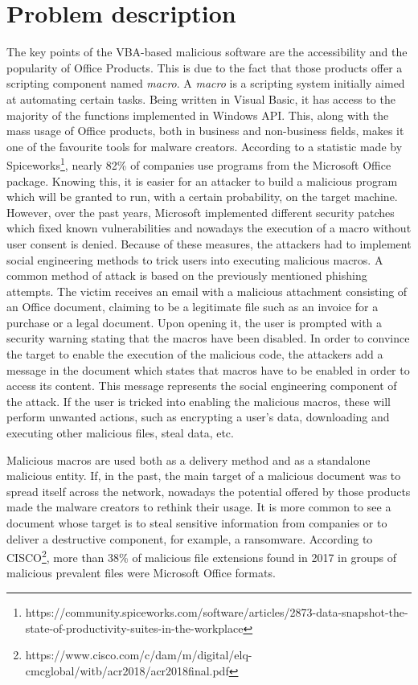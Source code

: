\section{Problem description}

The key points of the VBA-based malicious software are the accessibility and the popularity of Office Products. This is due to the fact that those products offer a scripting component named \textit{macro}. A \textit{macro} is a scripting system initially aimed at automating certain tasks. Being written in Visual Basic, it has access to the majority of the functions implemented in Windows API. This, along with the mass usage of Office products, both in business and non-business fields, makes it one of the favourite tools for malware creators. According to a statistic made by Spiceworks\footnote{https://community.spiceworks.com/software/articles/2873-data-snapshot-the-state-of-productivity-suites-in-the-workplace}, nearly 82\% of companies use programs from the Microsoft Office package. Knowing this, it is easier for an attacker to build a malicious program which will be granted to run, with a certain probability, on the target machine. However, over the past years, Microsoft implemented different security patches which fixed known vulnerabilities and nowadays the execution of a macro without user consent is denied. Because of these measures, the attackers had to implement social engineering methods to trick users into executing malicious macros. 
	A common method of attack is based on the previously mentioned phishing attempts. The victim receives an email with a malicious attachment consisting of an Office document, claiming to be a legitimate file such as an invoice for a purchase or a legal document. Upon opening it, the user is prompted with a security warning stating that the macros have been disabled. In order to convince the target to enable the execution of the malicious code, the attackers add a message in the document which states that macros have to be enabled in order to access its content. This message represents the social engineering component of the attack. If the user is tricked into enabling the malicious macros, these will perform unwanted actions, such as encrypting a user's data, downloading and executing other malicious files, steal data, etc.
\par
Malicious macros are used both as a delivery method and as a standalone malicious entity. If, in the past, the main target of a malicious document was to spread itself across the network, nowadays the potential offered by those products made the malware creators to rethink their usage. It is more common to see a document whose target is to steal sensitive information from companies or to deliver a destructive component, for example, a ransomware. According to CISCO\footnote{https://www.cisco.com/c/dam/m/digital/elq-cmcglobal/witb/acr2018/acr2018final.pdf}, more than 38\% of malicious file extensions found in 2017 in groups of malicious prevalent files were Microsoft Office formats.

